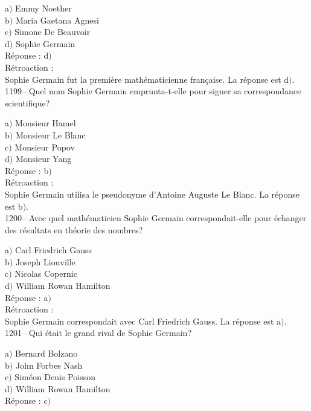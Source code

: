 ﻿\documentclass[letterpaper, 12pt]{article}
\begin{document}
a$)$ Emmy Noether \\
b$)$ Maria Gaetana Agnesi \\
c$)$ Simone De Beauvoir \\
d$)$ Sophie Germain\\

R\'eponse : d$)$\\

R\'etroaction : \\
Sophie Germain fut la premi\`ere math\'ematicienne fran\c caise.
La r\'eponse est d$)$.\\

1199-- Quel nom Sophie Germain emprunta-t-elle pour signer sa
correspondance scientifique?

a$)$ Monsieur Hamel \\
b$)$ Monsieur Le Blanc \\
c$)$ Monsieur Popov \\
d$)$ Monsieur Yang\\

R\'eponse : b$)$\\

R\'etroaction : \\
Sophie Germain utilisa le pseudonyme d'Antoine Auguste Le Blanc.  La
r\'eponse est b$)$.\\

1200-- Avec quel math\'ematicien Sophie Germain correspondait-elle
pour \'echanger des r\'esultats en th\'eorie des nombres?

a$)$ Carl Friedrich Gauss \\
b$)$ Joseph Liouville \\
c$)$ Nicolas Copernic \\
d$)$ William Rowan Hamilton\\

R\'eponse : a$)$\\

R\'etroaction : \\
Sophie Germain correspondait avec Carl Friedrich Gauss.
La r\'eponse est a$)$.\\

1201-- Qui \'etait le grand rival de Sophie Germain?

a$)$ Bernard Bolzano \\
b$)$ John Forbes Nash \\
c$)$ Sim\'eon Denis Poisson \\
d$)$ William Rowan Hamilton\\

R\'eponse : c$)$\\
\end{document}
